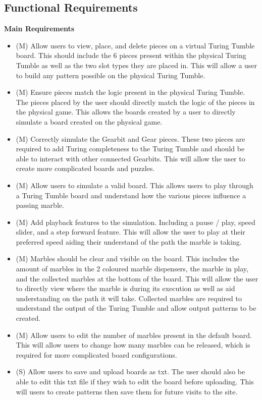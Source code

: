 \documentclass{l4proj}
\begin{document}
\subsection{Functional Requirements}
\textbf{Main Requirements}
\begin{itemize}
    \item (M) Allow users to view, place, and delete pieces on a virtual Turing Tumble board. This should include the 6 pieces present within the physical Turing Tumble as well as the two slot types they are placed in. This will allow a user to build any pattern possible on the physical Turing Tumble.
    \item (M) Ensure pieces match the logic present in the physical Turing Tumble. The pieces placed by the user should directly match the logic of the pieces in the physical game. This allows the boards created by a user to directly simulate a board created on the physical game.
    \item (M) Correctly simulate the Gearbit and Gear pieces. These two pieces are required to add Turing completeness to the Turing Tumble and should be able to interact with other connected Gearbits. This will allow the user to create more complicated boards and puzzles.
    \item (M) Allow users to simulate a valid board. This allows users to play through a Turing Tumble board and understand how the various pieces influence a passing marble.
    \item (M) Add playback features to the simulation. Including a pause / play, speed slider, and a step forward feature. This will allow the user to play at their preferred speed aiding their understand of the path the marble is taking.
    \item (M) Marbles should be clear and visible on the board. This includes the amount of marbles in the 2 coloured marble dispensers, the marble in play, and the collected marbles at the bottom of the board. This will allow the user to directly view where the marble is during its execution as well as aid understanding on the path it will take. Collected marbles are required to understand the output of the Turing Tumble and allow output patterns to be created.
    \item (M) Allow users to edit the number of marbles present in the default board. This will allow users to change how many marbles can be released, which is required for more complicated board configurations.
    \item (S) Allow users to save and upload boards as txt. The user should also be able to edit this txt file if they wish to edit the board before uploading. This will users to create patterns then save them for future visits to the site.

\end{itemize}
\end{document}
